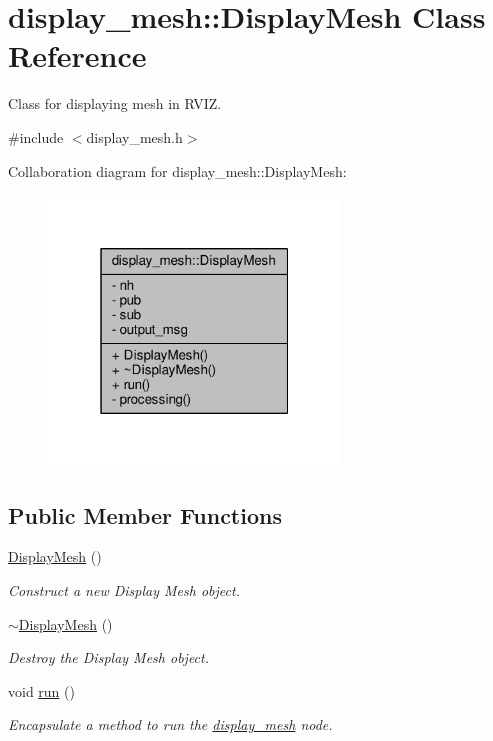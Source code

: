 \hypertarget{classdisplay__mesh_1_1_display_mesh}{}\section{display\+\_\+mesh\+:\+:Display\+Mesh Class Reference}
\label{classdisplay__mesh_1_1_display_mesh}


Class for displaying mesh in R\+V\+IZ.  




{\ttfamily \#include $<$display\+\_\+mesh.\+h$>$}



Collaboration diagram for display\+\_\+mesh\+:\+:Display\+Mesh\+:
\nopagebreak
\begin{figure}[H]
\begin{center}
\leavevmode
\includegraphics[width=220pt]{classdisplay__mesh_1_1_display_mesh__coll__graph}
\end{center}
\end{figure}
\subsection*{Public Member Functions}
\begin{DoxyCompactItemize}
\item 
\hyperlink{classdisplay__mesh_1_1_display_mesh_a75e143fd00c1a1b777eea976f8580030}{Display\+Mesh} ()
\begin{DoxyCompactList}\small\item\em Construct a new Display Mesh object. \end{DoxyCompactList}\item 
\hyperlink{classdisplay__mesh_1_1_display_mesh_a39727abcea404714b69aa465dd6df4bb}{$\sim$\+Display\+Mesh} ()
\begin{DoxyCompactList}\small\item\em Destroy the Display Mesh object. \end{DoxyCompactList}\item 
void \hyperlink{classdisplay__mesh_1_1_display_mesh_ac41b88adcb0deeaa2d4febee382c4f14}{run} ()
\begin{DoxyCompactList}\small\item\em Encapsulate a method to run the \hyperlink{namespacedisplay__mesh}{display\+\_\+mesh} node. \end{DoxyCompactList}\end{DoxyCompactItemize}
